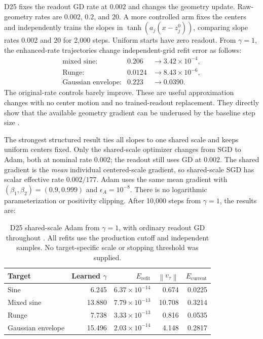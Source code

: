 \documentclass[11pt]{article}
\newcommand{\norm}[1]{\left\lVert#1\right\rVert}
\newcommand{\Eref}{E_{\mathrm{refit}}}
\newcommand{\Ecur}{E_{\mathrm{current}}}
\begin{document}
D25 fixes the readout GD rate at $0.002$ and changes the geometry update. Raw-geometry rates are $0.002$, $0.2$, and $20$. A more controlled arm fixes the centers and independently trains the slopes in $\tanh(a_j(x-z_j^0))$, comparing slope rates $0.002$ and $20$ for 2,000 steps. Uniform starts have zero readout. From $\gamma=1$, the enhanced-rate trajectories change independent-grid refit error as follows:
\begin{equation}
 \begin{array}{rcl}
 \text{mixed sine:}&0.206&\longrightarrow 3.42\times10^{-4},\\
 \text{Runge:}&0.0124&\longrightarrow 8.43\times10^{-6},\\
 \text{Gaussian envelope:}&0.223&\longrightarrow 0.0390.
 \end{array}
 \label{eq:D25-independent}
\end{equation}
The original-rate controls barely improve. These are useful approximation changes with no center motion and no trained-readout replacement. They directly show that the available geometry gradient can be underused by the baseline step size \cite{D25}.

The strongest structured result ties all slopes to one shared scale and keeps uniform centers fixed. Only the shared-scale optimizer changes from SGD to Adam, both at nominal rate $0.002$; the readout still uses GD at $0.002$. The shared gradient is the \emph{mean} individual centered-scale gradient, so shared-scale SGD has scalar effective rate $0.002/177$. Adam uses the same mean gradient with $(\beta_1,\beta_2)=(0.9,0.999)$ and $\epsilon_A=10^{-8}$. There is no logarithmic parameterization or positivity clipping. After 10,000 steps from $\gamma=1$, the results are:

\begin{table}[htbp]
\centering
\small
\begin{tabular}{@{}lrrrr@{}}
\toprule
Target & Learned $\gamma$ & $\Eref$ & $\norm{v_\tau}$ & $\Ecur$\\
\midrule
Sine & 6.245 & $6.37\times10^{-14}$ & 0.674 & 0.0225\\
Mixed sine & 13.880 & $7.79\times10^{-13}$ & 10.708 & 0.3214\\
Runge & 7.738 & $3.33\times10^{-13}$ & 0.816 & 0.0535\\
Gaussian envelope & 15.496 & $2.03\times10^{-14}$ & 4.148 & 0.2817\\
\bottomrule
\end{tabular}
\caption{D25 shared-scale Adam from $\gamma=1$, with ordinary readout GD throughout \cite{D25}. All refits use the production cutoff and independent samples. No target-specific scale or stopping threshold was supplied.}
\label{tab:D25-adaptive}
\end{table}
\end{document}
